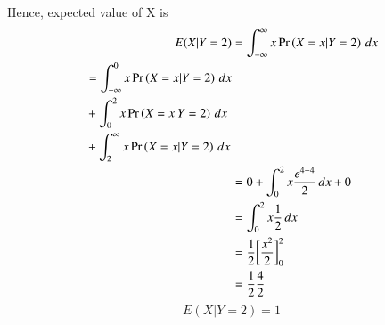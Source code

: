 \documentclass[journal,12pt,twocolumn]{IEEEtran}
\begin{document}
Hence, expected value of X is
\begin{align}
    E(X|Y=2) &= \int_{-\infty}^{\infty} x\Pr\left(X=x|Y=2\right) \,dx \\
    \begin{split}
        &= \int_{-\infty}^{0} x\Pr\left(X=x|Y=2\right) \,dx \\
        &+ \int_{0}^{2} x\Pr\left(X=x|Y=2\right) \,dx\\
        &+ \int_{2}^{\infty} x\Pr\left(X=x|Y=2\right) \,dx
    \end{split} \\
    &= 0+ \int_{0}^{2} x\frac{e^{4-4}}{2}\,dx  +0 \\
    &= \int_0^2 x\frac{1}{2} \,dx \\
    &= \frac{1}{2}\bigg[\frac{x^2}{2}\bigg]_0^2 \\
    &= \frac{1}{2} \frac{4}{2} 
\end{align}
\begin{equation}
    \boxed{E(X|Y=2) = 1}
\end{equation}
\end{document}
